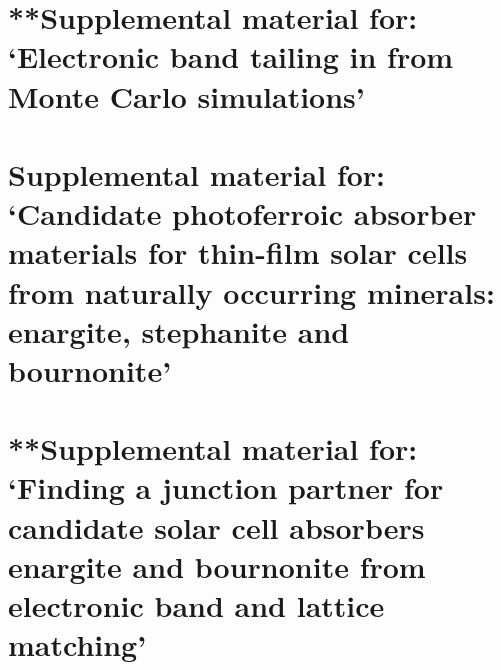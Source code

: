 \documentclass[11pt, twoside]{report}
\begin{document}
\section{**Supplemental material for: `Electronic band tailing in {\CZTS} from Monte Carlo simulations'}\label{band_tailing_appendix}

\section{Supplemental material for: `Candidate photoferroic absorber materials for thin-film solar cells from naturally occurring minerals: enargite, stephanite and bournonite'}\label{App_sulfosalts1}



\section{**Supplemental material for: `Finding a junction partner for candidate solar cell absorbers enargite and bournonite from electronic band and lattice matching'}\label{jp_appendix}



\end{document}
